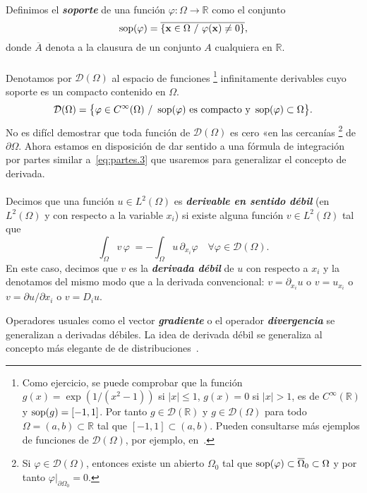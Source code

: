 \documentclass[11pt]{article}
\theoremstyle{plain}
\theoremstyle{definition}
\newcounter{stepnum}[section]
\newcommand{\step}[1][]{\bigskip\noindent\textbf{\thesection.\refstepcounter{stepnum}\thestepnum}.\enspace{#1}}
\renewcommand{\step}[1][]{\paragraph{#1}\hspace{-1.1em}}
\newcommand{\deff}[1]{\textit{\textbf{#1}}}
\newcommand{\R}{\ensuremath{\mathbb{R}}}
\newcommand{\xx}{\ensuremath{\mathbf{x}}\xspace}
\newcommand{\TestSpace}{\ensuremath{\mathcal{D}}}
\begin{document}
\step 
Definimos el \deff{soporte} de una función $\varphi:\Omega\to\R $ como el conjunto
\[
  \mathop{\rm sop}(\varphi) = \overline{\{\xx\in\Omega \ /\ \varphi(\xx)\neq 0\}},
\]
donde $\overline A$ denota a la clausura de un conjunto $A$ cualquiera en $\R$. 

\step
Denotamos por $\TestSpace(\Omega)$ al espacio de funciones%
%
\footnote{
  Como ejercicio, se puede comprobar que la función $g(x)=\exp(1/(x^2-1))$ si $|x|\le 1$, $g(x)=0$ si $|x|> 1$, es de $C^\infty(\R)$ y $\mathop{\rm sop}(g) = [-1,1]$. Por tanto $g\in\TestSpace(\R)$ y $g\in\TestSpace(\Omega)$ para todo $\Omega=(a,b)\subset\R$ tal que $[-1,1]\subset(a,b)$.  Pueden consultarse más ejemplos de funciones de $\TestSpace(\Omega)$,  por ejemplo, en~\cite{adams2003sobolev,sayas2019variational}.
}
%
infinitamente derivables cuyo soporte es un compacto contenido en $\Omega$. 
\[
  \TestSpace(\Omega) = \big\{\varphi\in C^\infty(\Omega) \ /\ \mathop{\rm sop}(\varphi) \text{ es compacto y }\mathop{\rm sop}(\varphi)\subset\Omega \big\}.
\]
No es difícl demostrar que toda función de $\TestSpace(\Omega)$ es cero «en las cercanías%
%
\footnote{Si $\varphi\in \TestSpace(\Omega)$, entonces existe un abierto $\Omega_0$ tal que $\mathop{\rm sop}(\varphi)\subset\overline\Omega_0\subset\Omega$ y por tanto $\varphi|_{\partial\Omega_0}=0$.}
%
de $\partial\Omega$. Ahora estamos en disposición de dar sentido a una fórmula de integración por partes similar a~\eqref{eq:partes.3} que usaremos para generalizar el concepto de derivada.

\step
Decimos que una función $u\in L^2(\Omega)$ es \deff{derivable en sentido débil}  (en $L^2(\Omega)$ y con respecto a la variable $x_i$) si existe alguna función $v\in L^2(\Omega)$ tal que
\[
  \int_\Omega v\, \varphi\; = -\int_\Omega u \, \partial_{x_i} \varphi \quad \forall \varphi \in \TestSpace(\Omega).
\]
En este caso, decimos que $v$ es la \deff{derivada débil} de $u$ con respecto a $x_i$ y la denotamos del mismo modo que a la derivada convencional: $v=\partial_{x_i}u$ o $v=u_{x_i}$ o $v=\partial u/\partial{x_i}$ o $v=D_i u$. 

Operadores usuales como el vector \deff{gradiente} o el operador \deff{divergencia} se generalizan a derivadas débiles. La idea de derivada débil se generaliza al concepto más elegante de de distribuciones~\cite{adams2003sobolev}.
\end{document}
